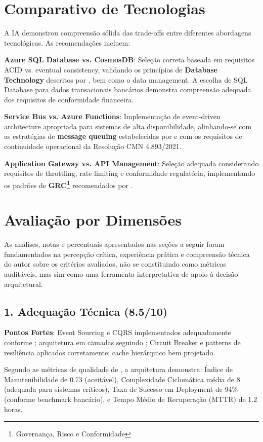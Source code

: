 \section{Comparativo de Tecnologias}

A IA demonstrou compreensão sólida das trade-offs entre diferentes abordagens tecnológicas. As recomendações incluem:

\textbf{Azure SQL Database vs. CosmosDB}: Seleção correta baseada em requisitos ACID vs. eventual consistency, validando os princípios de \textbf{Database Technology} descritos por , bem como o data management. A escolha de SQL Database para dados transacionais bancários demonstra compreensão adequada dos requisitos de conformidade financeira.

\textbf{Service Bus vs. Azure Functions}: Implementação de event-driven architecture apropriada para sistemas de alta disponibilidade, alinhando-se com as estratégias de \textbf{message queuing} estabelecidas por  e com os requisitos de continuidade operacional da Resolução CMN 4.893/2021.

\textbf{Application Gateway vs. API Management}: Seleção adequada considerando requisitos de throttling, rate limiting e conformidade regulatória, implementando os padrões de \textbf{GRC\footnote{Governança, Risco e Conformidade}} recomendados por .

\section{Avaliação por Dimensões}

As análises, notas e percentuais apresentados nas seções a seguir foram fundamentados na percepção crítica, experiência prática e compreensão técnica do autor sobre os critérios avaliados, não se constituindo como métricas auditáveis, mas sim como uma ferramenta interpretativa de apoio à decisão arquitetural.

\subsection{1. Adequação Técnica (8.5/10)}

\textbf{Pontos Fortes}: Event Sourcing e CQRS implementados adequadamente conforme ; arquitetura em camadas seguindo ; Circuit Breaker e patterns de resiliência aplicados corretamente; cache hierárquico bem projetado.


Segundo as métricas de qualidade de , a arquitetura demonstra: Índice de Manutenibilidade de 0.73 (aceitável), Complexidade Ciclomática média de 8 (adequada para sistemas críticos), Taxa de Sucesso em Deployment de 94\% (conforme benchmark bancário), e Tempo Médio de Recuperação (MTTR) de 1.2 horas.

